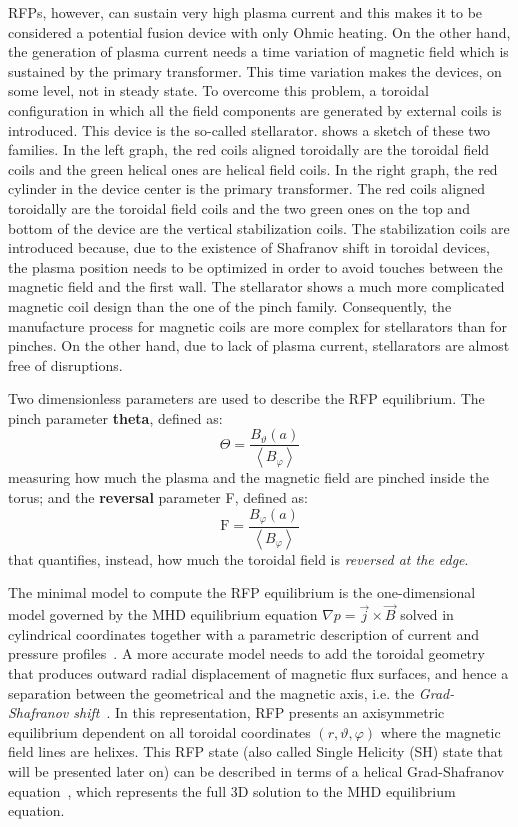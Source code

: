 RFPs, however, can sustain very high plasma current and this makes it to be considered a potential fusion device with only Ohmic heating. On the other hand, the generation of plasma current needs a time variation of magnetic field which is sustained by the primary transformer. This time variation makes the devices, on some level, not in steady state. To overcome this problem, a toroidal configuration in which all the field components are generated by external coils is introduced. This device is the so-called stellarator. \Figure{\ref{fig:pinch_families}} shows a sketch of these two families. In the left graph, the red coils aligned toroidally are the toroidal field coils and the green helical ones are helical field coils. In the right graph, the red cylinder in the device center is the primary transformer. The red coils aligned toroidally are the toroidal field coils and the two green ones on the top and bottom of the device are the vertical stabilization coils. The stabilization coils are introduced because, due to the existence of Shafranov shift in toroidal devices, the plasma position needs to be optimized in order to avoid touches between the magnetic field and the first wall. 
The stellarator shows a much more complicated magnetic coil design than the one of the pinch family. Consequently, the manufacture process for magnetic coils are more complex for stellarators than for pinches. On the other hand, due to lack of plasma current, stellarators are almost free of disruptions.

Two dimensionless parameters are used to describe the RFP equilibrium. 
The pinch parameter \textbf{theta}, defined as:
\begin{equation}
    \Theta = \frac{B_\vartheta (a)}{ \left\langle B_\varphi \right\rangle }
\end{equation}
measuring how much the plasma and the magnetic field are pinched inside the torus; and the \textbf{reversal} parameter F, defined as:
\begin{equation}
    \mathrm{F} = \frac{B_\varphi(a)}{ \left\langle B_\varphi \right\rangle }
\end{equation}
that quantifies, instead, how much the toroidal field is \emph{reversed at the edge}.

The minimal model to compute the RFP equilibrium is the one-dimensional model governed by the MHD equilibrium equation $\nabla p = \Vec{j} \times \Vec{B}$ solved in cylindrical coordinates together with a parametric description of current and pressure profiles~\cite{Bonomo33}.
A more accurate model needs to add the toroidal geometry that produces outward radial displacement of magnetic flux surfaces, and hence a separation between the geometrical and the magnetic axis, i.e. the \textit{Grad-Shafranov shift}~\cite{freidberg2014ideal}. 
In this representation, RFP presents an axisymmetric equilibrium dependent on all toroidal coordinates $(r, \vartheta, \varphi)$  where the magnetic field lines are helixes. This RFP state (also called Single Helicity (SH) state that will be presented later on) can be described in terms of a helical Grad-Shafranov equation~\cite{Bonomo35, Bonomo36}, which represents the full 3D solution to the MHD equilibrium equation.


